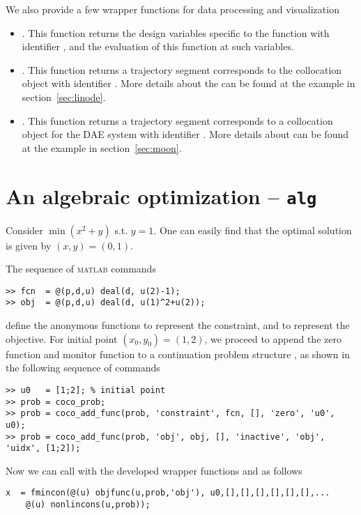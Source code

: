 We also provide a few wrapper functions for data processing and visualization
\begin{itemize}
\item {}. This function returns the design variables  specific to the function with identifier , and the evaluation of this function at such variables.
\item {}. This function returns a trajectory segment corresponds to the collocation object with identifier . More details about the  can be found at the example in section~\ref{sec:linode}. 
\item {}. This function returns a trajectory segment corresponds to a collocation object for the DAE system with identifier . More details about  can be found at the example in section~\ref{sec:moon}.
\end{itemize}


\section{An algebraic optimization -- \texttt{alg}}
Consider $\min (x^2+y)$ s.t. $y=1$. One can easily find that the optimal solution is given by $(x,y)=(0,1)$. 

The sequence of \textsc{matlab} commands
\begin{lstlisting}[language=coco-highlight]
>> fcn  = @(p,d,u) deal(d, u(2)-1);
>> obj  = @(p,d,u) deal(d, u(1)^2+u(2));
\end{lstlisting}
define the anonymous functions  to represent the constraint, and  to represent the objective.
For initial point $(x_0,y_0)=(1,2)$, we proceed to append the zero function  and monitor function  to a continuation problem structure , as shown in the following sequence of commands
\begin{lstlisting}[language=coco-highlight]
>> u0   = [1;2]; % initial point
>> prob = coco_prob;
>> prob = coco_add_func(prob, 'constraint', fcn, [], 'zero', 'u0', u0);
>> prob = coco_add_func(prob, 'obj', obj, [], 'inactive', 'obj', 'uidx', [1;2]);
\end{lstlisting}


Now we can call  with the developed wrapper functions  and  as follows
\begin{lstlisting}[language=coco-highlight]
x  = fmincon(@(u) objfunc(u,prob,'obj'), u0,[],[],[],[],[],[],...
    @(u) nonlincons(u,prob));
\end{lstlisting}




